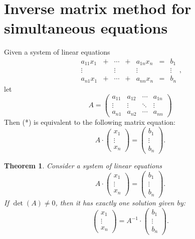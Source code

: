 \documentclass[
  12pt,
  oneside]{book}
\newtheorem{theorem}{Theorem}[chapter]
\theoremstyle{definition}
\theoremstyle{definition}
\theoremstyle{definition}
\theoremstyle{definition}
\theoremstyle{remark}
\begin{document}
\section{Inverse matrix method for simultaneous equations}\label{inverse-matrix-method-for-simultaneous-equations}

Given a system of linear equations
\begin{equation}
    \begin{matrix}
    a_{11}x_1 & + & \cdots & + & a_{1n}x_n & = &  b_1\\
    \vdots &   & \vdots &  & \vdots &  & \vdots\\
    a_{n1}x_1 & + & \cdots & + & a_{nn}x_n & = & b_n
\end{matrix},\tag{\(\ast\)}
\end{equation}
let
\[
A =
\begin{pmatrix}
    a_{11} & a_{12} & \cdots & a_{1n}\\
    \vdots & \vdots & \ddots & \vdots\\
    a_{n1} & a_{n2} & \cdots & a_{nn}
\end{pmatrix}
\]
Then (*) is equivalent to the following matrix equation:
\[
A\cdot
\begin{pmatrix}x_1\\\vdots\\ x_n\end{pmatrix}
=
\begin{pmatrix}b_1\\\vdots\\ b_n\end{pmatrix}.
\]

\begin{theorem}
Consider a system of linear equations
\[
  A\cdot
\begin{pmatrix}x_1\\\vdots\\ x_n\end{pmatrix}
=
\begin{pmatrix}b_1\\\vdots\\ b_n\end{pmatrix}.
\]
If \(\det(A)\not=0\), then it has exactly one solution given by:
\[
\begin{pmatrix}x_1\\\vdots\\ x_n\end{pmatrix}
=
A^{-1}\cdot
\begin{pmatrix}b_1\\\vdots\\ b_n\end{pmatrix}.
\]
\end{theorem}
\end{document}
